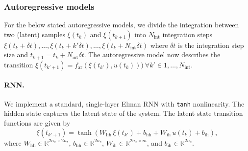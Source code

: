 \subsubsection{Autoregressive models}

For the below stated autoregressive models, we divide the integration between two (latent) samples $\xi(t_k)$ and $\xi(t_{k+1})$ into $N_\mathrm{int}$ integration steps $\xi(t_k + \delta t), \dots, \xi(t_k + k' \delta t), \dots, \xi(t_k + N_\mathrm{int} \delta t)$ where $\delta t$ is the integration step size and $t_{k+1} = t_k + N_\mathrm{int} \delta t$. The autoregressive model now describes the transition $\xi(t_{k'+1}) = f_\mathrm{ar}(\xi(t_{k'}), u(t_k))) \: \forall k' \in 1, \dots, N_\mathrm{int}$.

\paragraph{RNN.}
We implement a standard, single-layer Elman RNN with \texttt{tanh} nonlinearity. The hidden state captures the latent state of the system. The latent state transition functions are given by
\begin{equation}
    \xi(t_{k'+1})
    = \tanh(W_\mathrm{hh} \, \xi(t_{k'}) + b_\mathrm{hh} + W_\mathrm{ih} \, u(t_{k}) + b_\mathrm{ih}), 
\end{equation}
where $W_\mathrm{hh} \in \mathbb{R}^{2 n_z \times 2 n_z}$, $b_\mathrm{hh} \in \mathbb{R}^{2 n_z}$, $W_\mathrm{ih} \in \mathbb{R}^{2 n_z \times m}$, and $b_\mathrm{ih} \in \mathbb{R}^{2 n_z}$.

